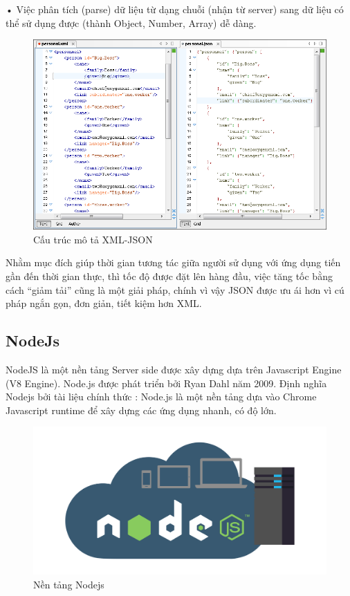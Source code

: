 • Việc phân tích (parse) dữ liệu từ dạng chuỗi (nhận từ server) sang dữ liệu có thể sử dụng được (thành Object, Number, Array) dễ dàng.
\begin{figure}[H]
	\centering    
	\includegraphics[width=1.0\textwidth]{json3}
	\caption[Cấu trúc mô tả XML-JSON]{Cấu trúc mô tả XML-JSON}
	\label{fig: json3}
\end{figure}
Nhằm mục đích giúp thời gian tương tác giữa người sử dụng với ứng dụng tiến gần đến thời gian thực, thì tốc độ được đặt lên hàng đầu, việc tăng tốc bằng cách “giảm tải” cũng là một giải pháp, chính vì vậy JSON được ưu ái hơn vì cú pháp ngắn gọn, đơn giản, tiết kiệm hơn XML.



\subsection{NodeJs}
NodeJS là một nền tảng Server side được xây dựng dựa trên Javascript Engine (V8 Engine). Node.js được phát triển bởi Ryan Dahl năm 2009. Định nghĩa Nodejs bởi tài liệu chính thức : Node.js là một nền tảng dựa vào Chrome Javascript runtime để xây dựng các ứng dụng nhanh, có độ lớn.  \cite{c2node}

\begin{figure}[H]
	\centering    
	\includegraphics[width=1.0\textwidth]{nodejs0}
	\caption[Nền tảng Nodejs]{Nền tảng Nodejs}
	\label{fig: nodejs0}
\end{figure}

